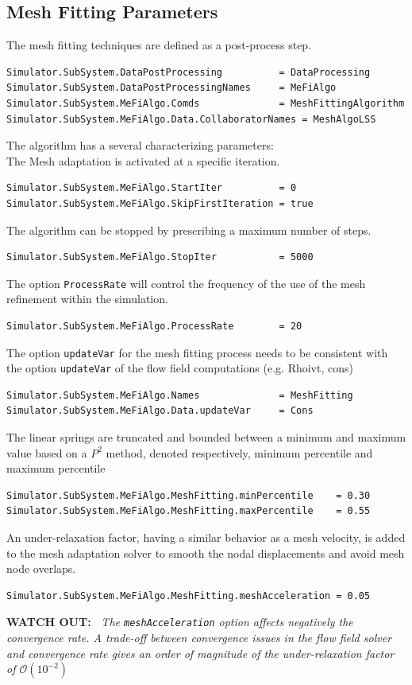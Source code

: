 \documentclass[11pt]{article}
\begin{document}
\subsection{Mesh Fitting Parameters}
The mesh fitting techniques are defined as a post-process step.
\begin{lstlisting}[breaklines]
Simulator.SubSystem.DataPostProcessing          = DataProcessing
Simulator.SubSystem.DataPostProcessingNames     = MeFiAlgo
Simulator.SubSystem.MeFiAlgo.Comds              = MeshFittingAlgorithm
Simulator.SubSystem.MeFiAlgo.Data.CollaboratorNames = MeshAlgoLSS
\end{lstlisting}
The algorithm has a several characterizing parameters:\\
\newline
The Mesh adaptation is activated at a specific iteration.
\begin{lstlisting}[breaklines]
Simulator.SubSystem.MeFiAlgo.StartIter          = 0
Simulator.SubSystem.MeFiAlgo.SkipFirstIteration = true
\end{lstlisting}
The algorithm can be stopped by prescribing a maximum number of steps.
\begin{lstlisting}[breaklines]
Simulator.SubSystem.MeFiAlgo.StopIter           = 5000  
\end{lstlisting}
The option {\tt ProcessRate} will control the frequency of the use of the mesh refinement within the simulation.
\begin{lstlisting}[breaklines]
Simulator.SubSystem.MeFiAlgo.ProcessRate        = 20
\end{lstlisting}
The option {\tt updateVar} for the mesh fitting process needs to be consistent with the option {\tt updateVar} of the flow field computations (e.g. Rhoivt, cons)
\begin{lstlisting}[breaklines]
Simulator.SubSystem.MeFiAlgo.Names              = MeshFitting
Simulator.SubSystem.MeFiAlgo.Data.updateVar     = Cons
\end{lstlisting}
The linear springs are truncated and bounded between a minimum and maximum value based on a $P^2$ method, denoted respectively, minimum percentile and maximum percentile
\begin{lstlisting}[breaklines]
Simulator.SubSystem.MeFiAlgo.MeshFitting.minPercentile    = 0.30
Simulator.SubSystem.MeFiAlgo.MeshFitting.maxPercentile    = 0.55
\end{lstlisting}
An under-relaxation factor,  having a similar behavior as a mesh velocity, is added to the mesh adaptation solver to smooth the nodal displacements and avoid mesh node overlaps.
\begin{lstlisting}[breaklines]
Simulator.SubSystem.MeFiAlgo.MeshFitting.meshAcceleration = 0.05
\end{lstlisting}
{\bf WATCH OUT:~} {\it The {\tt meshAcceleration} option affects negatively the convergence rate. A trade-off between convergence issues in the flow field solver and convergence rate gives an order of magnitude of the under-relaxation factor of $\mathcal{O}(10^{-2})$}
\end{document}
